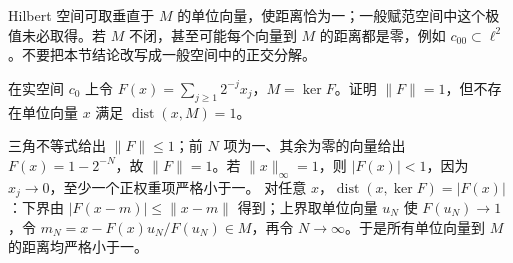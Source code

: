 \begin{remark}
Hilbert 空间可取垂直于 $M$ 的单位向量，使距离恰为一；一般赋范空间中这个极值未必取得。若 $M$ 不闭，甚至可能每个向量到 $M$ 的距离都是零，例如 $c_{00}\subset\ell^2$。不要把本节结论改写成一般空间中的正交分解。
\end{remark}

\begin{exercise}
在实空间 $c_0$ 上令 $F(x)=\sum_{j\ge1}2^{-j}x_j$，$M=\ker F$。证明 $\|F\|=1$，但不存在单位向量 $x$ 满足 $\operatorname{dist}(x,M)=1$。
\end{exercise}
\begin{solution}
三角不等式给出 $\|F\|\le1$；前 $N$ 项为一、其余为零的向量给出 $F(x)=1-2^{-N}$，故 $\|F\|=1$。若 $\|x\|_\infty=1$，则 $|F(x)|<1$，因为 $x_j\to0$，至少一个正权重项严格小于一。
对任意 $x$，$\operatorname{dist}(x,\ker F)=|F(x)|$：下界由 $|F(x-m)|\le\|x-m\|$ 得到；上界取单位向量 $u_N$ 使 $F(u_N)\to1$，令 $m_N=x-F(x)u_N/F(u_N)\in M$，再令 $N\to\infty$。于是所有单位向量到 $M$ 的距离均严格小于一。
\end{solution}
